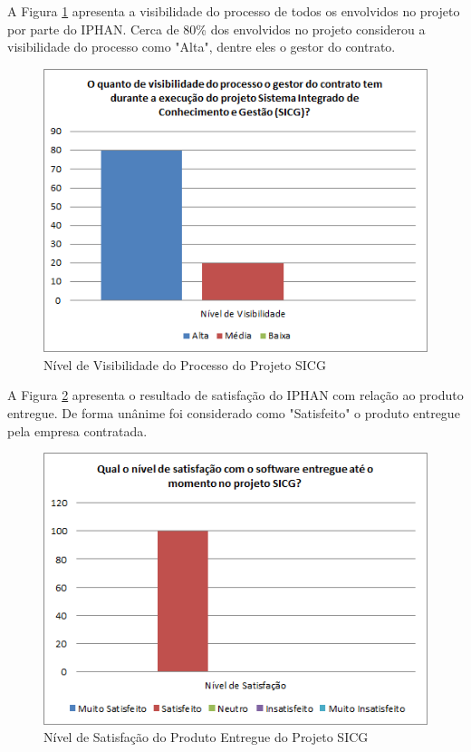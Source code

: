 A Figura \ref{visibilidade} apresenta a visibilidade do processo de todos os envolvidos no projeto por parte do IPHAN. Cerca de 80\% dos envolvidos no projeto considerou a visibilidade do processo como "Alta", dentre eles o gestor do contrato.

\begin{figure}[H]
		\centering
			\includegraphics[scale=1.0]{figuras/visibilidade.png}
		\caption{Nível de Visibilidade do Processo do Projeto SICG}
		\label{visibilidade}
\end{figure}

A Figura \ref{satisfacao} apresenta o resultado de satisfação do IPHAN com relação ao produto entregue. De forma unânime foi considerado como "Satisfeito" o produto entregue pela empresa contratada. 

\begin{figure}[H]
		\centering
			\includegraphics[scale=1.0]{figuras/satisfacao.png}
		\caption{Nível de Satisfação do Produto Entregue do Projeto SICG}
		\label{satisfacao}
\end{figure}

